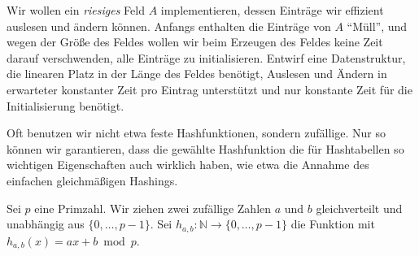 \documentclass{uebung_cs}
\begin{document}
\begin{aufgabe}
	Wir wollen ein \textit{riesiges} Feld $A$ implementieren, dessen Einträge wir effizient auslesen und ändern können.
	Anfangs enthalten die Einträge von $A$ \enquote{Müll}, und wegen der Größe des Feldes wollen wir beim Erzeugen des Feldes keine Zeit darauf verschwenden, alle Einträge zu initialisieren.
	Entwirf eine Datenstruktur, die linearen Platz in der Länge des Feldes benötigt, Auslesen und Ändern in erwarteter konstanter Zeit pro Eintrag unterstützt und nur konstante Zeit für die Initialisierung benötigt.
\end{aufgabe}

\newpage
\begin{aufgabe}
  Oft benutzen wir nicht etwa feste Hashfunktionen, sondern zufällige.
  Nur so können wir garantieren, dass die gewählte Hashfunktion die für Hashtabellen so wichtigen Eigenschaften auch wirklich haben, wie etwa die Annahme des einfachen gleichmäßigen Hashings.
  
  Sei $p$ eine Primzahl.
  Wir ziehen zwei zufällige Zahlen $a$ und $b$ gleichverteilt und unabhängig aus $\{0,\dots,p-1\}$.
  Sei $h_{a,b}\colon\mathbb N\to\{0,\dots,p-1\}$ die Funktion mit $h_{a,b}(x)=ax+b\bmod p$.
  

\end{aufgabe}
\end{document}
